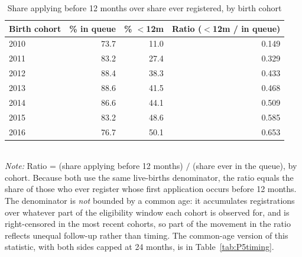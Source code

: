 \begin{table}[htbp]\centering
\caption{Share applying before 12 months over share ever registered, by birth cohort}
\label{tab:S8c}
\small
\begin{tabular}{lrrr}
\toprule
Birth cohort & \% in queue & \% $<$12m & Ratio ($<$12m / in queue) \\
\midrule
2010 & 73.7 & 11.0 & 0.149 \\
2011 & 83.2 & 27.4 & 0.329 \\
2012 & 88.4 & 38.3 & 0.433 \\
2013 & 88.6 & 41.5 & 0.468 \\
2014 & 86.6 & 44.1 & 0.509 \\
2015 & 83.2 & 48.6 & 0.585 \\
2016 & 76.7 & 50.1 & 0.653 \\
\bottomrule
\end{tabular}
\\[3pt]{\footnotesize \textit{Note:} Ratio = (share applying before 12 months) $/$ (share ever in the queue), by cohort. Because both use the same live-births denominator, the ratio equals the share of those who ever register whose first application occurs before 12 months. The denominator is \emph{not} bounded by a common age: it accumulates registrations over whatever part of the eligibility window each cohort is observed for, and is right-censored in the most recent cohorts, so part of the movement in the ratio reflects unequal follow-up rather than timing. The common-age version of this statistic, with both sides capped at 24 months, is in Table~\ref{tab:P5timing}.}
\end{table}

